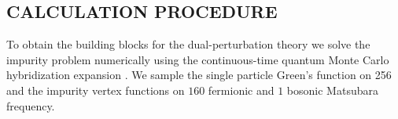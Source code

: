 \documentclass[aps,prb,twocolumn,amsmath,notitlepage,floatfix,footinbib,superscriptaddress,showpacs, showkeys]{revtex4-1}
\begin{document}
\begin{appendix}
\renewcommand{\appendixname}{APPENDIX}



\setcounter{figure}{0}   \renewcommand{\thefigure}{A\arabic{figure}}
\setcounter{equation}{0} \renewcommand{\theequation}{A.\arabic{equation}}
\renewcommand{\thesubsection}{A.\Roman{section}.\Alph{subsection}}
\makeatletter
\renewcommand*{\p@subsection}{}  
\makeatother
\renewcommand{\thesubsubsection}{A.\Roman{section}.\Alph{subsection}-\arabic{subsubsection}}
\makeatletter
\renewcommand*{\p@subsubsection}{}  %
\makeatother

\section{CALCULATION PROCEDURE}\label{app:calc_proc}
To obtain the building blocks for the dual-perturbation theory we solve the impurity problem numerically using the continuous-time quantum Monte Carlo hybridization expansion \cite{Hafermann2013}. 
We sample the single particle Green's function on 256 and the impurity vertex functions on $160$ fermionic and $1$ bosonic Matsubara frequency. 


\end{appendix}
\end{document}
